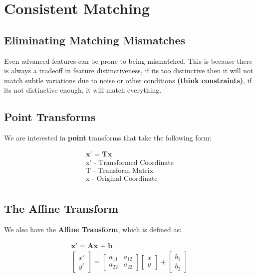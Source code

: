 \section{Consistent Matching}

\subsection{Eliminating Matching Mismatches}

Even advanced features can be prone to being mismatched. This is because there is always a tradeoff in feature distinctiveness, if its too distinctive then it will not match subtle variations due to noise or other conditions \textbf{(think constraints)}, if its not distinctive enough, it will match everything.

\subsection{Point Transforms}

We are interested in \textbf{point} transforms that take the following form:

\begin{align}
    \textbf{x' = Tx} \\
    \text{x' - Transformed Coordinate}\\
    \text{T - Transform Matrix} \\
    \text{x - Original Coordinate} \\
\end{align}

\subsection{The Affine Transform}

\noindent We also have the \textbf{Affine Transform}, which is defined as:

\begin{align}
    \textbf{x' = Ax + b} \\
    \begin{bmatrix} x' \\ y' \end{bmatrix} = \begin{bmatrix}
    a_{11} & a_{12} \\ a_{22} & a_{22}
    \end{bmatrix} \begin{bmatrix}
    x \\ y
    \end{bmatrix} + \begin{bmatrix}
    b_{1} \\ b_{2}
    \end{bmatrix}
\end{align}


